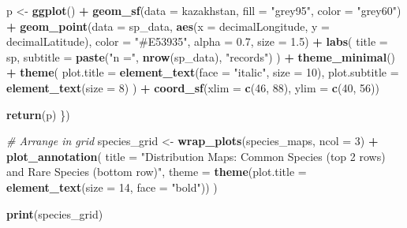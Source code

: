 \documentclass[
]{article}
\newenvironment{Shaded}{\begin{snugshade}}{\end{snugshade}}
\newcommand{\AttributeTok}[1]{\textcolor[rgb]{0.13,0.29,0.53}{#1}}
\newcommand{\CommentTok}[1]{\textcolor[rgb]{0.56,0.35,0.01}{\textit{#1}}}
\newcommand{\DecValTok}[1]{\textcolor[rgb]{0.00,0.00,0.81}{#1}}
\newcommand{\FloatTok}[1]{\textcolor[rgb]{0.00,0.00,0.81}{#1}}
\newcommand{\FunctionTok}[1]{\textcolor[rgb]{0.13,0.29,0.53}{\textbf{#1}}}
\newcommand{\NormalTok}[1]{#1}
\newcommand{\OtherTok}[1]{\textcolor[rgb]{0.56,0.35,0.01}{#1}}
\newcommand{\SpecialCharTok}[1]{\textcolor[rgb]{0.81,0.36,0.00}{\textbf{#1}}}
\newcommand{\StringTok}[1]{\textcolor[rgb]{0.31,0.60,0.02}{#1}}
\begin{document}
\begin{Shaded}
\begin{Highlighting}[]
\NormalTok{  p }\OtherTok{\textless{}{-}} \FunctionTok{ggplot}\NormalTok{() }\SpecialCharTok{+}
    \FunctionTok{geom\_sf}\NormalTok{(}\AttributeTok{data =}\NormalTok{ kazakhstan, }\AttributeTok{fill =} \StringTok{"grey95"}\NormalTok{, }\AttributeTok{color =} \StringTok{"grey60"}\NormalTok{) }\SpecialCharTok{+}
    \FunctionTok{geom\_point}\NormalTok{(}\AttributeTok{data =}\NormalTok{ sp\_data,}
               \FunctionTok{aes}\NormalTok{(}\AttributeTok{x =}\NormalTok{ decimalLongitude, }\AttributeTok{y =}\NormalTok{ decimalLatitude),}
               \AttributeTok{color =} \StringTok{"\#E53935"}\NormalTok{, }\AttributeTok{alpha =} \FloatTok{0.7}\NormalTok{, }\AttributeTok{size =} \FloatTok{1.5}\NormalTok{) }\SpecialCharTok{+}
    \FunctionTok{labs}\NormalTok{(}
      \AttributeTok{title =}\NormalTok{ sp,}
      \AttributeTok{subtitle =} \FunctionTok{paste}\NormalTok{(}\StringTok{"n ="}\NormalTok{, }\FunctionTok{nrow}\NormalTok{(sp\_data), }\StringTok{"records"}\NormalTok{)}
\NormalTok{    ) }\SpecialCharTok{+}
    \FunctionTok{theme\_minimal}\NormalTok{() }\SpecialCharTok{+}
    \FunctionTok{theme}\NormalTok{(}
      \AttributeTok{plot.title =} \FunctionTok{element\_text}\NormalTok{(}\AttributeTok{face =} \StringTok{"italic"}\NormalTok{, }\AttributeTok{size =} \DecValTok{10}\NormalTok{),}
      \AttributeTok{plot.subtitle =} \FunctionTok{element\_text}\NormalTok{(}\AttributeTok{size =} \DecValTok{8}\NormalTok{)}
\NormalTok{    ) }\SpecialCharTok{+}
    \FunctionTok{coord\_sf}\NormalTok{(}\AttributeTok{xlim =} \FunctionTok{c}\NormalTok{(}\DecValTok{46}\NormalTok{, }\DecValTok{88}\NormalTok{), }\AttributeTok{ylim =} \FunctionTok{c}\NormalTok{(}\DecValTok{40}\NormalTok{, }\DecValTok{56}\NormalTok{))}
  
  \FunctionTok{return}\NormalTok{(p)}
\NormalTok{\})}

\CommentTok{\# Arrange in grid}
\NormalTok{species\_grid }\OtherTok{\textless{}{-}} \FunctionTok{wrap\_plots}\NormalTok{(species\_maps, }\AttributeTok{ncol =} \DecValTok{3}\NormalTok{) }\SpecialCharTok{+}
  \FunctionTok{plot\_annotation}\NormalTok{(}
    \AttributeTok{title =} \StringTok{"Distribution Maps: Common Species (top 2 rows) and Rare Species (bottom row)"}\NormalTok{,}
    \AttributeTok{theme =} \FunctionTok{theme}\NormalTok{(}\AttributeTok{plot.title =} \FunctionTok{element\_text}\NormalTok{(}\AttributeTok{size =} \DecValTok{14}\NormalTok{, }\AttributeTok{face =} \StringTok{"bold"}\NormalTok{))}
\NormalTok{  )}

\FunctionTok{print}\NormalTok{(species\_grid)}
\end{Highlighting}
\end{Shaded}
\end{document}
